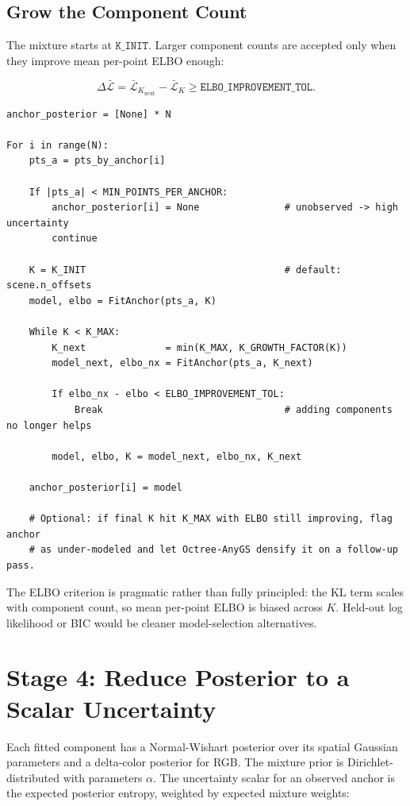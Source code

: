 \documentclass[11pt]{article}
\begin{document}
\subsection{Grow the Component Count}

The mixture starts at \(\texttt{K\_INIT}\). Larger component counts are accepted
only when they improve mean per-point ELBO enough:

\[
  \Delta \bar{\mathcal{L}}
  =
  \bar{\mathcal{L}}_{K_{\mathrm{next}}}
  -
  \bar{\mathcal{L}}_K
  \geq
  \texttt{ELBO\_IMPROVEMENT\_TOL}.
\]

\begin{lstlisting}
anchor_posterior = [None] * N

For i in range(N):
    pts_a = pts_by_anchor[i]

    If |pts_a| < MIN_POINTS_PER_ANCHOR:
        anchor_posterior[i] = None               # unobserved -> high uncertainty
        continue

    K = K_INIT                                   # default: scene.n_offsets
    model, elbo = FitAnchor(pts_a, K)

    While K < K_MAX:
        K_next              = min(K_MAX, K_GROWTH_FACTOR(K))
        model_next, elbo_nx = FitAnchor(pts_a, K_next)

        If elbo_nx - elbo < ELBO_IMPROVEMENT_TOL:
            Break                                # adding components no longer helps

        model, elbo, K = model_next, elbo_nx, K_next

    anchor_posterior[i] = model

    # Optional: if final K hit K_MAX with ELBO still improving, flag anchor
    # as under-modeled and let Octree-AnyGS densify it on a follow-up pass.
\end{lstlisting}

The ELBO criterion is pragmatic rather than fully principled: the KL term
scales with component count, so mean per-point ELBO is biased across \(K\).
Held-out log likelihood or BIC would be cleaner model-selection alternatives.

\section{Stage 4: Reduce Posterior to a Scalar Uncertainty}

Each fitted component has a Normal-Wishart posterior over its spatial Gaussian
parameters and a delta-color posterior for RGB. The mixture prior is
Dirichlet-distributed with parameters \(\alpha\). The uncertainty scalar for
an observed anchor is the expected posterior entropy, weighted by expected
mixture weights:
\end{document}
